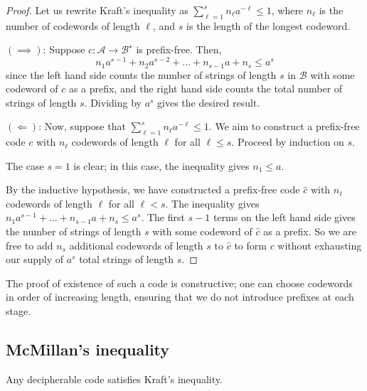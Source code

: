 \begin{proof}
    Let us rewrite Kraft's inequality as $\sum_{\ell=1}^s n_\ell a^{-\ell} \leq 1$, where $n_\ell$ is the number of codewords of length $\ell$, and $s$ is the length of the longest codeword.

    $(\implies)$: Suppose $c \colon \mathcal A \to \mathcal B^\star$ is prefix-free.
    Then,
    \[ n_1 a^{s-1} + n_2 a^{s-2} + \dots + n_{s-1} a + n_s \leq a^s \]
    since the left hand side counts the number of strings of length $s$ in $\mathcal B$ with some codeword of $c$ as a prefix, and the right hand side counts the total number of strings of length $s$.
    Dividing by $a^s$ gives the desired result.

    $(\Longleftarrow)$: Now, suppose that $\sum_{\ell=1}^s n_\ell a^{-\ell} \leq 1$.
    We aim to construct a prefix-free code $c$ with $n_\ell$ codewords of length $\ell$ for all $\ell \leq s$.
    Proceed by induction on $s$.

    The case $s = 1$ is clear; in this case, the inequality gives $n_1 \leq a$.

    By the inductive hypothesis, we have constructed a prefix-free code $\hat c$ with $n_\ell$ codewords of length $\ell$ for all $\ell < s$.
    The inequality gives $n_1 a^{s-1} + \dots + n_{s-1} a + n_s \leq a^s$.
    The first $s - 1$ terms on the left hand side gives the number of strings of length $s$ with some codeword of $\hat c$ as a prefix.
    So we are free to add $n_s$ additional codewords of length $s$ to $\hat c$ to form $c$ without exhausting our supply of $a^s$ total strings of length $s$.
\end{proof}

\begin{remark}
    The proof of existence of such a code is constructive; one can choose codewords in order of increasing length, ensuring that we do not introduce prefixes at each stage.
\end{remark}

\subsection{McMillan's inequality}
\begin{theorem}
    Any decipherable code satisfies Kraft's inequality.
\end{theorem}


